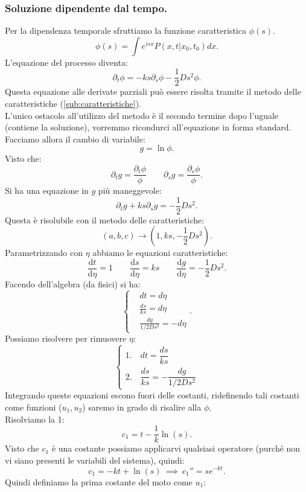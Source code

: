 \subsubsection{Soluzione dipendente dal tempo.}%
\label{subsub:Soluzione dipendente dal tempo}
Per la dipendenza temporale sfruttiamo la funzione caratteristica $\phi (s)$.
\[
    \phi (s) = \int e^{isx}P(x,t|x_0,t_0) dx
.\] 
L'equazione del processo diventa:
\[
    \partial_{t}\phi  = -ks\partial_{s}\phi  - \frac{1}{2}Ds^2\phi
.\] 
Questa equazione alle derivate parziali può essere risolta tramite il metodo delle caratteristiche (\ref{sub:caratteristiche}).\\
L'unico ostacolo all'utilizzo del metodo è il secondo termine dopo l'uguale (contiene la soluzione), vorremmo ricondurci all'equazione in forma standard. \\
Facciamo allora il cambio di variabile:
\[
    g = \ln\phi 
.\] 
Visto che:
\[
     \partial_{t}g =\frac{\partial_{t}\phi}{\phi} \qquad 
     \partial_{s}g = \frac{\partial_{s}\phi}{\phi}
.\] 
Si ha una equazione in $g$ più maneggevole:
\[
    \partial_{t}g + k s \partial_{s}g = -\frac{1}{2}Ds^2
.\] 
Questa è risolubile con il metodo delle caratteristiche: 
\[
    (a, b, c) \to (1, ks, -\frac{1}{2}Ds^2) 
.\] 
Parametrizzando con $\eta$ abbiamo le equazioni caratteristiche:
\[
        \frac{\text{d} t}{\text{d} \eta} = 1 
	\qquad
	\frac{\text{d} s}{\text{d} \eta} = ks 
	\qquad
	\frac{\text{d} g}{\text{d} \eta} = -\frac{1}{2}D s^2
.\] 
Facendo dell'algebra (da fisici) si ha:
\[
    \begin{cases}
	& dt = d\eta  \\
	& \frac{ds}{ks} = d\eta  \\
	& \frac{dg}{1 / 2 Ds^2} = - d\eta
    \end{cases}
.\] 
Possiamo risolvere per rimuovere $\eta$:
\[
    \begin{cases}
        1. \quad dt = \dfrac{ds}{ks}\\
	2. \quad \dfrac{ds}{ks} = - \dfrac{dg}{1 / 2 Ds^2}
    \end{cases}
\] 
Integrando queste equazioni escono fuori delle costanti, ridefinendo tali costanti come funzioni ($u_1,u_2$) saremo in grado di risalire alla $\phi$.\\ 
Risolviamo la 1:
\[
    c_1 = t - \frac{1}{k}\ln (s) 
.\] 
Visto che $c_1$ è una costante possiamo applicarvi qualsiasi operatore (purché non vi siano presenti le variabili del sistema), quindi:
\[
    c_1=-kt + \ln (s) \ \implies \ c_1'' = s e^{-kt}
.\] 
Quindi definiamo la prima costante del moto come $u_1$:
